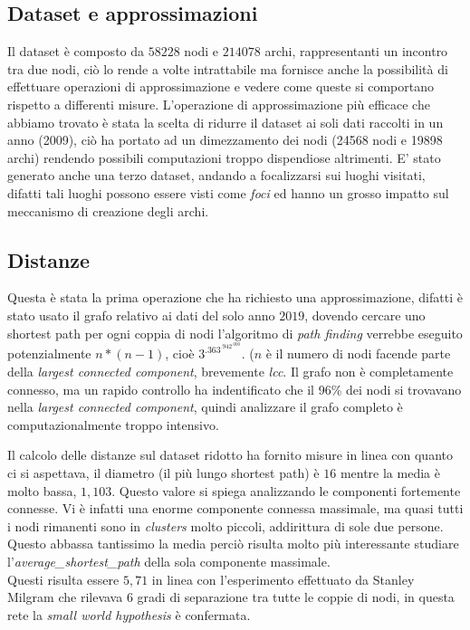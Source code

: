 \documentclass[a4paper]{article}
\newcommand{\lcc}{\textit{largest connected component}}
\begin{document}
\subsection{Dataset e approssimazioni}
Il dataset è composto da $58228$ nodi e $214078$ archi, rappresentanti un incontro tra due nodi, ciò lo rende a volte intrattabile ma fornisce anche la possibilità di effettuare operazioni di approssimazione e vedere come queste si comportano rispetto a differenti misure.
L'operazione di approssimazione più efficace che abbiamo trovato è stata la scelta di ridurre il dataset ai soli dati raccolti in un anno (2009), ciò ha portato ad un dimezzamento dei nodi (24568 nodi e 19898 archi) rendendo possibili computazioni troppo dispendiose altrimenti.
E' stato generato anche una terzo dataset, andando a focalizzarsi sui luoghi visitati, difatti tali luoghi possono essere visti come \textit{foci} ed hanno un grosso impatto sul meccanismo di creazione degli archi.

\subsection{Distanze}
Questa è stata la prima operazione che ha richiesto una approssimazione, difatti è stato usato il grafo relativo ai dati del solo anno $2019$, dovendo cercare uno shortest path per ogni coppia di nodi l'algoritmo di \textit{path finding} verrebbe eseguito potenzialmente $n*(n-1)$, cioè $3^.363^.942^.000$. ($n$ è il numero di nodi facende parte della \textit{largest connected component}, brevemente \textit{lcc}.
Il grafo non è completamente connesso, ma un rapido controllo ha indentificato che il 96\% dei nodi si trovavano nella \lcc, quindi analizzare il grafo completo è computazionalmente troppo intensivo.


Il calcolo delle distanze sul dataset ridotto ha fornito misure in linea con quanto ci si aspettava, il diametro (il più lungo shortest path) è $16$ mentre la media è molto bassa, $1,103$. Questo valore si spiega analizzando le componenti fortemente connesse.
Vi è infatti una enorme componente connessa massimale, ma quasi tutti i nodi rimanenti sono in \textit{clusters} molto piccoli, addirittura di sole due persone. Questo abbassa tantissimo la media perciò risulta molto più interessante studiare l'\textit{average\_shortest\_path} della sola componente massimale.\\
Questi risulta essere $5,71$ in linea con l'esperimento effettuato da Stanley Milgram che rilevava 6 gradi di separazione tra tutte le coppie di nodi, in questa rete la \textit{small world hypothesis} è confermata. 
\end{document}
